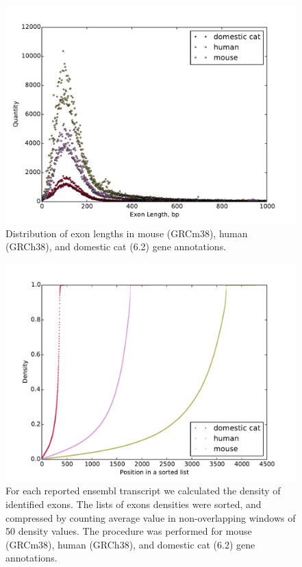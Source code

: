 \documentclass{article}
\begin{document}
\begin{figure}[h]
\centering
\includegraphics[width=\textwidth]{images/exon_distr_human_mouse_cat.pdf}
\caption{Distribution of exon lengths in mouse (GRCm38), human (GRCh38), and domestic cat (6.2) gene annotations.}
\label{fig:human_mouse_cat_exons}
\end{figure}


\begin{figure}[h]
\centering
\includegraphics[width=\textwidth]{images/exon_density_human_mouse_cat.pdf}
\caption{For each reported ensembl transcript we calculated the density of identified exons. The lists of exons densities were sorted, and compressed by counting average value in non-overlapping windows of 50 density values. The procedure was performed for mouse (GRCm38), human (GRCh38), and domestic cat (6.2) gene annotations.}
\label{fig:human_mouse_cat_exon_density}
\end{figure}
\end{document}

